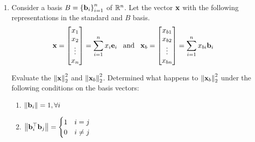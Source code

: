 \documentclass[12pt]{article}
\def\mf{\ensuremath\mathbf}
\def\mb{\ensuremath\mathbb}
\begin{document}
\begin{enumerate}



    \item Consider a basis $B = \left\{\mf{b}_i\right\}_{i=1}^{n}$ of $\mb{R}^n$. Let the vector $\mf{x}$ with the following representations in the standard and $B$ basis.
    \[ \mf{x} = \begin{bmatrix*}x_1\\x_2\\\vdots\\x_n\end{bmatrix*} = \sum_{i=1}^{n}x_i\mf{e}_i \,\,\,\,\, \text{and} \,\,\,\,\, \mf{x}_b =  \begin{bmatrix*}x_{b1}\\x_{b2}\\\vdots\\x_{bn}\end{bmatrix*} = \sum_{i=1}^{n}x_{bi}\mf{b}_i \]

    Evaluate the $\left\lVert \mf{x}\right\rVert_2^2$ and $\left\lVert \mf{x}_b\right\rVert_2^2$. Determined what happens to $\left\lVert \mf{x}_b\right\rVert_2^2$ under the following conditions on the basis vectors:
    \begin{enumerate}
        \item $\left\lVert \mf{b}_i\right\rVert = 1, \forall i$
        \item $\left\lVert \mf{b}_i^\top\mf{b}_j\right\rVert = \begin{cases}
        1 & i = j\\
        0 & i \neq j
        \end{cases}$
    \end{enumerate}


\end{enumerate}
\end{document}

